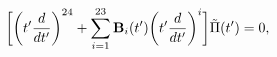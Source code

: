 \begin{equation}
\label{eq:PFdiffeq1}
\biggl[\biggl(t^\prime{d\over dt^\prime}\biggr)^{24}+\sum_{i=1}^{23}{\bf B}_i(t^\prime)\biggl(t^\prime{d\over dt^\prime}\biggr)^i\biggr]
\tilde{\Pi}(t^\prime)=0,
\end{equation}

